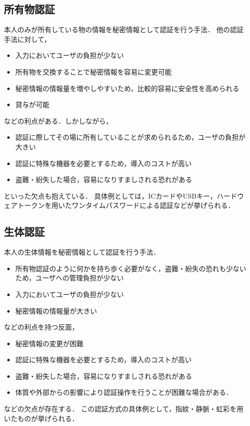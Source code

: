 \subsection{所有物認証}
本人のみが所有している物の情報を秘密情報として認証を行う手法．
他の認証手法に対して，
\begin{itemize}
\item 入力においてユーザの負担が少ない
\item 所有物を交換することで秘密情報を容易に変更可能
\item 秘密情報の情報量を増やしやすいため，比較的容易に安全性を高められる
\item 貸与が可能
\end{itemize}
などの利点がある．しかしながら，
\begin{itemize}
\item 認証に際してその場に所有していることが求められるため，ユーザの負担が大きい
\item 認証に特殊な機器を必要とするため，導入のコストが高い
\item 盗難・紛失した場合，容易になりすましされる恐れがある
\end{itemize}
といった欠点も抱えている．
具体例としては，ICカードやUSBキー，ハードウェアトークンを用いたワンタイムパスワードによる認証などが挙げられる．

\subsection{生体認証}
本人の生体情報を秘密情報として認証を行う手法．
\begin{itemize}
\item 所有物認証のように何かを持ち歩く必要がなく，盗難・紛失の恐れも少ないため，ユーザへの管理負担が少ない
\item 入力においてユーザの負担が少ない
\item 秘密情報の情報量が大きい
\end{itemize}
などの利点を持つ反面，
\begin{itemize}
\item 秘密情報の変更が困難
\item 認証に特殊な機器を必要とするため，導入のコストが高い
\item 盗難・紛失した場合，容易になりすましされる恐れがある
\item 体質や外部からの影響により認証操作を行うことが困難な場合がある．
\end{itemize}
などの欠点が存在する．
この認証方式の具体例として，指紋・静脈・虹彩を用いたものが挙げられる．

